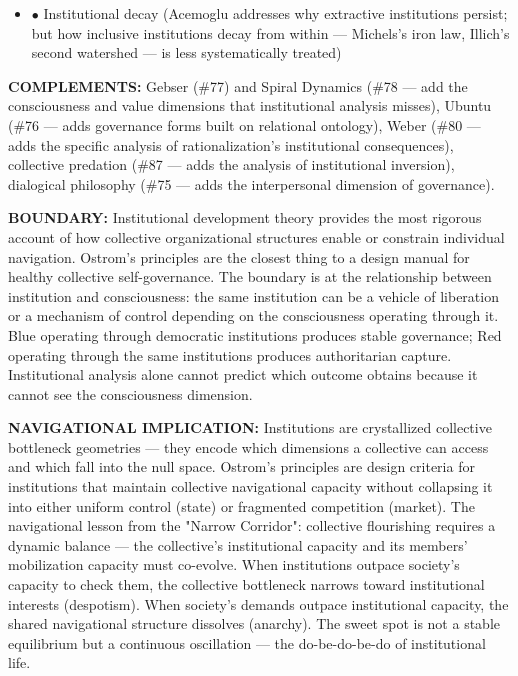 \begin{itemize}[nosep,leftmargin=*]
  \item $\bullet$ Institutional decay (Acemoglu addresses why extractive institutions persist; but how inclusive institutions decay from within — Michels's iron law, Illich's second watershed — is less systematically treated)
\end{itemize}


\textbf{COMPLEMENTS:} Gebser (\#77) and Spiral Dynamics (\#78 — add the consciousness and value dimensions that institutional analysis misses), Ubuntu (\#76 — adds governance forms built on relational ontology), Weber (\#80 — adds the specific analysis of rationalization's institutional consequences), collective predation (\#87 — adds the analysis of institutional inversion), dialogical philosophy (\#75 — adds the interpersonal dimension of governance).


\textbf{BOUNDARY:} Institutional development theory provides the most rigorous account of how collective organizational structures enable or constrain individual navigation. Ostrom's principles are the closest thing to a design manual for healthy collective self-governance. The boundary is at the relationship between institution and consciousness: the same institution can be a vehicle of liberation or a mechanism of control depending on the consciousness operating through it. Blue operating through democratic institutions produces stable governance; Red operating through the same institutions produces authoritarian capture. Institutional analysis alone cannot predict which outcome obtains because it cannot see the consciousness dimension.


\textbf{NAVIGATIONAL IMPLICATION:} Institutions are crystallized collective bottleneck geometries — they encode which dimensions a collective can access and which fall into the null space. Ostrom's principles are design criteria for institutions that maintain collective navigational capacity without collapsing it into either uniform control (state) or fragmented competition (market). The navigational lesson from the "Narrow Corridor": collective flourishing requires a dynamic balance — the collective's institutional capacity and its members' mobilization capacity must co-evolve. When institutions outpace society's capacity to check them, the collective bottleneck narrows toward institutional interests (despotism). When society's demands outpace institutional capacity, the shared navigational structure dissolves (anarchy). The sweet spot is not a stable equilibrium but a continuous oscillation — the do-be-do-be-do of institutional life.


